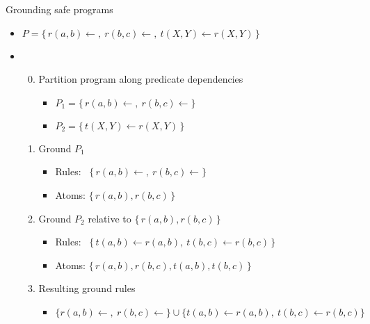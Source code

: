 \begin{frame}{Grounding safe programs}
  \begin{itemize}
  \item<1-> \(
    P = \{\, r(a,b)\leftarrow{}, \ r(b,c)\leftarrow{}, \ t(X,Y) \leftarrow r(X,Y) \,\}
    \)
    \medskip
  \item <2-> 
    \smallskip
    \begin{enumerate}\setcounter{enumi}{-1}
    \item <3-> Partition program along predicate dependencies
      \begin{itemize}\small
      \item \( P_1 = \{\, r(a,b) \leftarrow {},    \ r(b,c)\leftarrow{} \} \)
      \item \( P_2 = \{\, t(X,Y) \leftarrow r(X,Y) \,\} \)
      \end{itemize}
      \smallskip
    \item <4-> Ground $P_1$
      \begin{itemize}\small
      \item Rules: \ $\{\, r(a,b)\leftarrow{}, \ r(b,c)\leftarrow{} \}$
      \item Atoms:   $\{\, r(a,b), r(b,c) \,\}$
      \end{itemize}
      \smallskip
    \item<5-> Ground $P_2$ relative to $\{\, r(a,b), r(b,c) \,\}$
      \begin{itemize}\small
      \item Rules: \ $\{\, t(a,b) \leftarrow r(a,b),\ t(b,c) \leftarrow r(b,c) \,\}$
      \item Atoms:   $\{\, r(a,b), r(b,c), t(a,b), t(b,c) \,\}$
      \end{itemize}
      \smallskip
    \item<6-> Resulting ground rules
      \begin{itemize}\small
      \item  $\{ r(a,b)\leftarrow{}, \ r(b,c)\leftarrow{} \}\cup \{ t(a,b) \leftarrow r(a,b),\ t(b,c) \leftarrow r(b,c) \}$
      \end{itemize}
    \end{enumerate}
  \end{itemize}
\end{frame}
%
